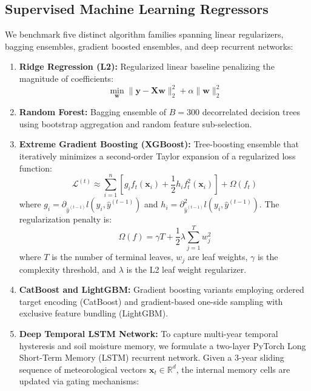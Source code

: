 \documentclass[conference]{IEEEtran}
\begin{document}
\subsection{Supervised Machine Learning Regressors}
We benchmark five distinct algorithm families spanning linear regularizers, bagging ensembles, gradient boosted ensembles, and deep recurrent networks:
\begin{enumerate}
    \item \textbf{Ridge Regression (L2):} Regularized linear baseline penalizing the magnitude of coefficients:
    \begin{equation}
    \min_{\mathbf{w}} \|\mathbf{y} - \mathbf{X}\mathbf{w}\|_2^2 + \alpha \|\mathbf{w}\|_2^2
    \end{equation}
    \item \textbf{Random Forest:} Bagging ensemble of $B = 300$ decorrelated decision trees using bootstrap aggregation and random feature sub-selection.
    \item \textbf{Extreme Gradient Boosting (XGBoost):} Tree-boosting ensemble that iteratively minimizes a second-order Taylor expansion of a regularized loss function:
    \begin{equation}
    \mathcal{L}^{(t)} \approx \sum_{i=1}^n \left[ g_i f_t(\mathbf{x}_i) + \frac{1}{2} h_i f_t^2(\mathbf{x}_i) \right] + \Omega(f_t)
    \end{equation}
    where $g_i = \partial_{\hat{y}^{(t-1)}} l(y_i, \hat{y}^{(t-1)})$ and $h_i = \partial_{\hat{y}^{(t-1)}}^2 l(y_i, \hat{y}^{(t-1)})$. The regularization penalty is:
    \begin{equation}
    \Omega(f) = \gamma T + \frac{1}{2}\lambda \sum_{j=1}^T w_j^2
    \end{equation}
    where $T$ is the number of terminal leaves, $w_j$ are leaf weights, $\gamma$ is the complexity threshold, and $\lambda$ is the L2 leaf weight regularizer.
    \item \textbf{CatBoost and LightGBM:} Gradient boosting variants employing ordered target encoding (CatBoost) and gradient-based one-side sampling with exclusive feature bundling (LightGBM).
    \item \textbf{Deep Temporal LSTM Network:} To capture multi-year temporal hysteresis and soil moisture memory, we formulate a two-layer PyTorch Long Short-Term Memory (LSTM) recurrent network. Given a 3-year sliding sequence of meteorological vectors $\mathbf{x}_t \in \mathbb{R}^d$, the internal memory cells are updated via gating mechanisms:
    \begin{align}

\end{align}
\end{enumerate}
\end{document}
